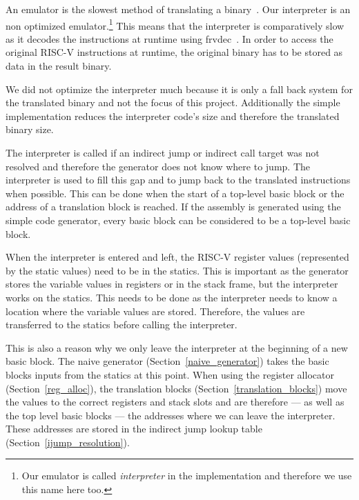 \documentclass[course=eragp]{aspdoc}
\begin{document}
An emulator is the slowest method of translating a binary~\cite{binary_translation}. Our interpreter
is an non optimized emulator.\footnote{Our emulator is called \textit{interpreter} in the implementation
    and therefore we use this name here too.} This means that the interpreter is comparatively slow as it decodes the
instructions at runtime using frvdec~\cite{frvdec}. In order to access the original RISC-V
instructions at runtime, the original binary has to be stored as data in the result binary.

\par

We did not optimize the interpreter much because it is only a fall back system for the translated
binary and not the focus of this project. Additionally the simple implementation reduces the
interpreter code's size and therefore the translated binary size.

\par

The interpreter is called if an indirect jump or indirect call target was not resolved and therefore
the generator does not know where to jump. The interpreter is used to fill this gap and to jump
back to the translated instructions when possible. This can be done when the start of a top-level basic block
or the address of a translation block is reached. If the assembly is generated using the simple code
generator, every basic block can be considered to be a top-level basic block.

\par

When the interpreter is entered and left, the RISC-V register values (represented by the static
values) need to be in the statics. This is important as the generator stores the variable values in
registers or in the stack frame, but the interpreter works on the statics. This needs to be done as
the interpreter needs to know a location where the variable values are stored. Therefore, the values are
transferred to the statics before calling the interpreter.

\par

This is also a reason why we only leave the interpreter at the beginning of a new basic block. The
naive generator (Section~\ref{naive_generator}) takes the basic blocks inputs from the statics at
this point.
When using the register allocator (Section~\ref{reg_alloc}), the translation blocks
(Section~\ref{translation_blocks}) move the values to the correct registers and stack slots and are
therefore --- as well as the top level basic blocks --- the addresses where we can leave the
interpreter. These addresses are stored in the indirect jump lookup table (Section~\ref{ijump_resolution}).
\end{document}
